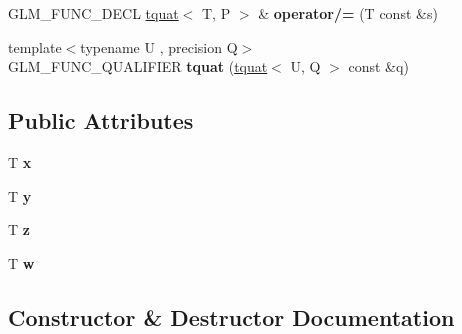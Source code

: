 \begin{DoxyCompactItemize}
\item 
G\+L\+M\+\_\+\+F\+U\+N\+C\+\_\+\+D\+E\+CL \hyperlink{structglm_1_1detail_1_1tquat}{tquat}$<$ T, P $>$ \& {\bfseries operator/=} (T const \&s)\hypertarget{structglm_1_1detail_1_1tquat_a1a620ff3b4f138ad2f2fa34f36de1097}{}\label{structglm_1_1detail_1_1tquat_a1a620ff3b4f138ad2f2fa34f36de1097}

\item 
{\footnotesize template$<$typename U , precision Q$>$ }\\G\+L\+M\+\_\+\+F\+U\+N\+C\+\_\+\+Q\+U\+A\+L\+I\+F\+I\+ER {\bfseries tquat} (\hyperlink{structglm_1_1detail_1_1tquat}{tquat}$<$ U, Q $>$ const \&q)\hypertarget{structglm_1_1detail_1_1tquat_a5a904126767e3f0d447ea22e27447e7e}{}\label{structglm_1_1detail_1_1tquat_a5a904126767e3f0d447ea22e27447e7e}

\end{DoxyCompactItemize}
\subsection*{Public Attributes}
\begin{DoxyCompactItemize}
\item 
T {\bfseries x}\hypertarget{structglm_1_1detail_1_1tquat_ae4db777c41ba0c7329107a4c7aa1f956}{}\label{structglm_1_1detail_1_1tquat_ae4db777c41ba0c7329107a4c7aa1f956}

\item 
T {\bfseries y}\hypertarget{structglm_1_1detail_1_1tquat_a50895e2da4e59255b25271a44ae3e43d}{}\label{structglm_1_1detail_1_1tquat_a50895e2da4e59255b25271a44ae3e43d}

\item 
T {\bfseries z}\hypertarget{structglm_1_1detail_1_1tquat_a65c2b0af6a4b59327015b766f25416ef}{}\label{structglm_1_1detail_1_1tquat_a65c2b0af6a4b59327015b766f25416ef}

\item 
T {\bfseries w}\hypertarget{structglm_1_1detail_1_1tquat_a83472ee38e4268c15ac92658e1ebfbb0}{}\label{structglm_1_1detail_1_1tquat_a83472ee38e4268c15ac92658e1ebfbb0}

\end{DoxyCompactItemize}


\subsection{Constructor \& Destructor Documentation}
